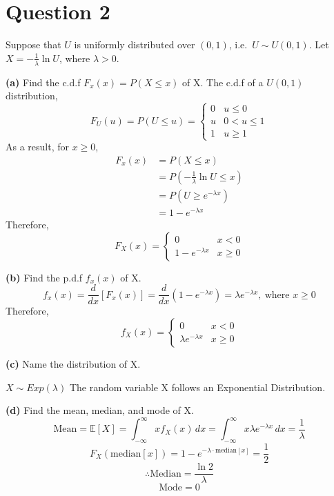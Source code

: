 \documentclass[
]{book}
\begin{document}
\section{Question 2}\label{question-2-4}

Suppose that \(U\) is uniformly distributed over \((0,1)\), i.e.~\(U \sim U(0,1)\). Let \(X = -\frac{1}{\lambda}\ln{U}\), where \(\lambda > 0\).

\textbf{(a)} Find the c.d.f \(F_x(x) = P(X \leq x)\) of X.
The c.d.f of a \(U(0,1)\) distribution,
\[
\begin{equation}
  F_U(u) = P(U \leq u) = 
  \begin{cases}
    0   &   u \leq 0 \\
    u   &   0 < u \leq 1 \\
    1   &   u \geq 1
  \end{cases}
\end{equation}
\]
As a result, for \(x \geq 0\),
\[\begin{align}
  F_x(x) &= P(X \leq x) \\ 
  &= P(-\frac{1}{\lambda}\ln{U} \leq x) \\
         &= P(U \geq e^{-\lambda x}) \\
         &= 1 - e^{-\lambda x}
\end{align}\]
Therefore,
\[
\begin{equation}
  F_X(x) = 
  \begin{cases}
    0   &   x < 0 \\
    1 - e^{-\lambda x}    &   x \geq 0
  \end{cases}
\end{equation}
\]

\textbf{(b)} Find the p.d.f \(f_x(x)\) of X.
\[f_x(x) = \frac{d}{dx} [F_x(x)] = \frac{d}{dx} (1 - e^{-\lambda x}) = \lambda e^{-\lambda x}, \ \text{where } x \geq 0\]
Therefore,
\[
\begin{equation}
  f_X(x) = 
  \begin{cases}
    0   &   x < 0 \\
    \lambda e^{-\lambda x}   &   x \geq 0
  \end{cases}
\end{equation}
\]

\textbf{(c)} Name the distribution of X.

\(X \sim Exp(\lambda)\)
The random variable X follows an Exponential Distribution.

\textbf{(d)} Find the mean, median, and mode of X.
\[\text{Mean} = \mathbb{E}[X] = \int_{-\infty}^{\infty} xf_X(x) \,dx = \int_{-\infty}^{\infty} x \lambda e^{-\lambda x} \,dx = \frac{1}{\lambda}\]
\[F_X(\text{median}[x]) = 1 - e^{-\lambda \cdot \text{median}[x]}= \frac{1}{2}\]
\[\therefore \text{Median} = \frac{\ln{2}}{\lambda}\]
\[\text{Mode} = 0\]
\end{document}
